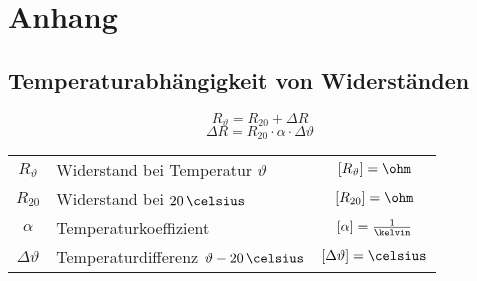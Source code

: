 \section{Anhang}

\subsection{Temperaturabhängigkeit von Widerständen}

\begin{minipage}[c]{0.3\columnwidth}
    $$ \boxed{R_{\vartheta} = R_{20} + \Delta R} $$
    $$ \boxed{\Delta R = R_{20} \cdot \alpha \cdot \Delta \vartheta} $$
\end{minipage}
\hfill
\begin{minipage}[c]{0.68\columnwidth}
    \begin{tabular}{c l c}
        $R_{\vartheta}$     & Widerstand bei Temperatur $\vartheta$             & $[R_{\vartheta}] = \ohm$ \\
        $R_{20}$            & Widerstand bei $20 \, \celsius$                   & $[R_{20}] = \ohm$ \\
        $\alpha$            & Temperaturkoeffizient                             & $[\alpha] = \frac{1}{\kelvin}$\\
        $\Delta \vartheta$  & Temperaturdifferenz $\vartheta - 20 \, \celsius$  & $[\Delta \vartheta] = \celsius$\\
    \end{tabular}
\end{minipage}